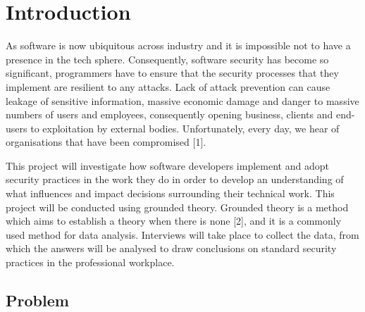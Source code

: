 \chapter{Introduction}\label{C:intro}

\par As software is now ubiquitous across industry and it is impossible not to have a presence in the tech sphere. Consequently, software security has become so significant, programmers have to ensure that the security processes that they implement are resilient to any attacks. Lack of attack prevention can cause leakage of sensitive information, massive economic damage and danger to massive numbers of users and employees, consequently opening business, clients and end-users to exploitation by external bodies. Unfortunately, every day, we hear of organisations that have been compromised [1].
\newline
\par This project will investigate how software developers implement and adopt security practices in the work they do in order to develop an understanding of what influences and impact decisions surrounding their technical work. This project will be conducted using grounded theory. Grounded theory is a method which aims to establish a theory when there is none [2], and it is a commonly used method for data analysis. Interviews will take place to collect the data, from which the answers will be analysed to draw conclusions on standard security practices in the professional workplace.

\section{Problem}


